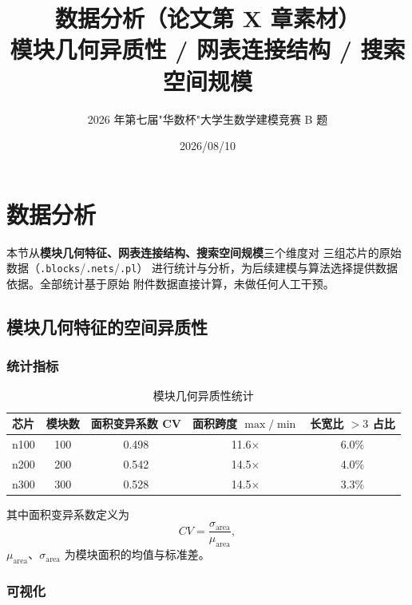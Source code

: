 \documentclass[12pt,a4paper]{article}
\title{\textbf{数据分析（论文第 X 章素材）}\\[6pt]
\large 模块几何异质性 / 网表连接结构 / 搜索空间规模}
\author{2026 年第七届"华数杯"大学生数学建模竞赛 B 题}
\date{2026/08/10}
\begin{document}
\maketitle

\section{数据分析}

本节从\textbf{模块几何特征、网表连接结构、搜索空间规模}三个维度对
三组芯片的原始数据（\texttt{.blocks}/\texttt{.nets}/\texttt{.pl}）
进行统计与分析，为后续建模与算法选择提供数据依据。全部统计基于原始
附件数据直接计算，未做任何人工干预。

\subsection{模块几何特征的空间异质性}

\subsubsection{统计指标}

\begin{table}[H]
\centering
\scriptsize
\setlength{\tabcolsep}{3pt}
\caption{模块几何异质性统计}
\begin{tabular}{lcccc}
\toprule
芯片 & 模块数 & 面积变异系数 CV & 面积跨度 $\max/\min$ & 长宽比 $>3$ 占比 \\
\midrule
n100 & 100 & 0.498 & 11.6$\times$ & 6.0\% \\
n200 & 200 & 0.542 & 14.5$\times$ & 4.0\% \\
n300 & 300 & 0.528 & 14.5$\times$ & 3.3\% \\
\bottomrule
\end{tabular}
\end{table}

其中面积变异系数定义为
\begin{equation}
CV = \frac{\sigma_{\text{area}}}{\mu_{\text{area}}},
\end{equation}
$\mu_{\text{area}}$、$\sigma_{\text{area}}$ 为模块面积的均值与标准差。

\subsubsection{可视化}
\end{document}
